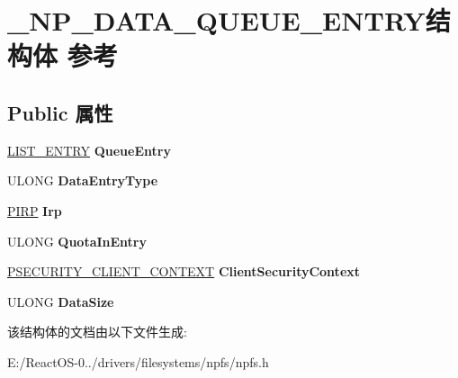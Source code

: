 \hypertarget{struct___n_p___d_a_t_a___q_u_e_u_e___e_n_t_r_y}{}\section{\+\_\+\+N\+P\+\_\+\+D\+A\+T\+A\+\_\+\+Q\+U\+E\+U\+E\+\_\+\+E\+N\+T\+R\+Y结构体 参考}
\label{struct___n_p___d_a_t_a___q_u_e_u_e___e_n_t_r_y}
\subsection*{Public 属性}
\begin{DoxyCompactItemize}
\item 
\mbox{\label{struct___n_p___d_a_t_a___q_u_e_u_e___e_n_t_r_y_aa9797d6f8ae3aebccf52b1f7fd5fa904}} 
\hyperlink{struct___l_i_s_t___e_n_t_r_y}{L\+I\+S\+T\+\_\+\+E\+N\+T\+RY} {\bfseries Queue\+Entry}
\item 
\mbox{\label{struct___n_p___d_a_t_a___q_u_e_u_e___e_n_t_r_y_aa6f68c2ed743cfba803caab8b189b859}} 
U\+L\+O\+NG {\bfseries Data\+Entry\+Type}
\item 
\mbox{\label{struct___n_p___d_a_t_a___q_u_e_u_e___e_n_t_r_y_ac9297ae5041dbdd6da3b95ab1e83dd5c}} 
\hyperlink{interfacevoid}{P\+I\+RP} {\bfseries Irp}
\item 
\mbox{\label{struct___n_p___d_a_t_a___q_u_e_u_e___e_n_t_r_y_a77ad7fbe5b7751b41b102a09ca5e904a}} 
U\+L\+O\+NG {\bfseries Quota\+In\+Entry}
\item 
\mbox{\label{struct___n_p___d_a_t_a___q_u_e_u_e___e_n_t_r_y_a4b1bb09a25ea6d3d6d1c3ac65f84f148}} 
\hyperlink{struct___s_e_c_u_r_i_t_y___c_l_i_e_n_t___c_o_n_t_e_x_t}{P\+S\+E\+C\+U\+R\+I\+T\+Y\+\_\+\+C\+L\+I\+E\+N\+T\+\_\+\+C\+O\+N\+T\+E\+XT} {\bfseries Client\+Security\+Context}
\item 
\mbox{\label{struct___n_p___d_a_t_a___q_u_e_u_e___e_n_t_r_y_a1d238bf4568243f14d86751ea19e9a16}} 
U\+L\+O\+NG {\bfseries Data\+Size}
\end{DoxyCompactItemize}


该结构体的文档由以下文件生成\+:\begin{DoxyCompactItemize}
\item 
E\+:/\+React\+O\+S-\/0../drivers/filesystems/npfs/npfs.\+h\end{DoxyCompactItemize}
